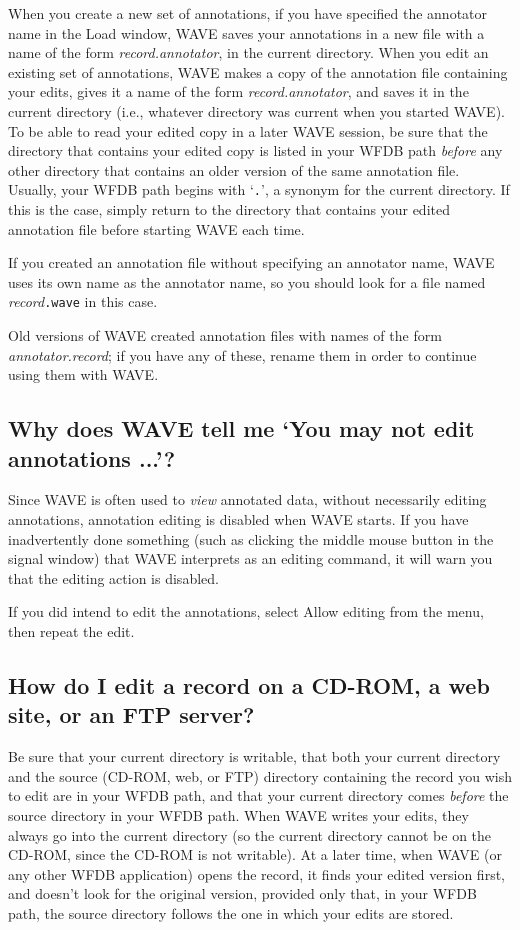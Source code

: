 \documentclass[twoside]{book}
\newcommand{\button}[1]{\cornersize{2}\ovalbox{\rule[-.3mm]{0cm}{2.5mm}\small\sf ~#1~}}
\newcommand{\menubutton}[1]{\button{#1~\ensuremath{\nabla}}}
\newcommand{\WAVE}{{\sf WAVE}\xspace}
\begin{document}
When you create a new set of annotations, if you have specified the annotator
name in the {\sf Load} window, \WAVE{} saves your annotations in a new file
with a name of the form {\it record.annotator}, in the current directory.  When
you edit an existing set of annotations, \WAVE{} makes a copy of the annotation
file containing your edits, gives it a name of the form {\it record.annotator},
and saves it in the current directory (i.e., whatever directory was current
when you started \WAVE{}).  To be able to read your edited copy in a later
\WAVE{} session, be sure that the directory that contains your edited copy is
listed in your WFDB path \emph{before} any other directory that contains an
older version of the same annotation file.  Usually, your WFDB path begins with
`{\tt .}', a synonym for the current directory.  If this is the case, simply
return to the directory that contains your edited annotation file before
starting \WAVE{} each time.

If you created an annotation file without specifying an annotator
name, \WAVE{} uses its own name as the annotator name, so you should
look for a file named {\it record}{\tt .wave} in this case.

Old versions of \WAVE{} created annotation files with names of the form
{\it annotator.record};  if you have any of these, rename them in order to
continue using them with \WAVE{}.

\subsection{Why does \WAVE{} tell me `You may not edit annotations ...'?}

Since \WAVE{} is often used to \emph{view} annotated data, without
necessarily editing annotations, annotation editing is disabled when
\WAVE{} starts.  If you have inadvertently done something (such as
clicking the middle mouse button in the signal window) that \WAVE{}
interprets as an editing command, it will warn you that the editing
action is disabled.

If you did intend to edit the annotations, select {\sf Allow editing} from the
\menubutton{Edit} menu, then repeat the edit.

\subsection{How do I edit a record on a CD-ROM, a web site, or an FTP server?}

Be sure that your current directory is writable, that both your current
directory and the source (CD-ROM, web, or FTP) directory containing the record
you wish to edit are in your WFDB path, and that your current directory comes
\emph{before} the source directory in your WFDB path.  When \WAVE{} writes your
edits, they always go into the current directory (so the current directory
cannot be on the CD-ROM, since the CD-ROM is not writable).  At a later time,
when \WAVE{} (or any other WFDB application) opens the record, it finds your
edited version first, and doesn't look for the original version, provided only
that, in your WFDB path, the source directory follows the one in which your
edits are stored.
\end{document}
